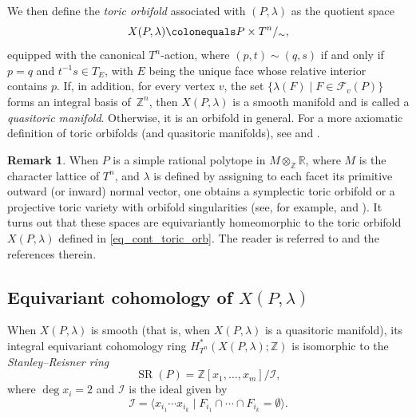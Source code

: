 \documentclass[10pt]{amsart}
\theoremstyle{plain}
\theoremstyle{definition}
\newtheorem{remark}[theorem]{Remark}
\numberwithin{equation}{section}
\newcommand{\RR}{\mathbb{R}}
\newcommand{\ZZ}{\mathbb{Z}}
\DeclareMathOperator{\SR}{SR}
\begin{document}
We then define the \emph{toric orbifold} associated with $(P,\lambda)$ as the quotient space 
\begin{equation}\label{eq_cont_toric_orb}
X(P, \lambda) \colonequals P\times T^n /_\sim,
\end{equation}
equipped with the canonical $T^n$-action, where $(p,t)\sim (q,s)$ if and only if $p=q$ and $t^{-1}s \in T_E$, with $E$ being the unique face whose relative interior contains $p$. If, in addition, for every vertex $v$, the set $\{\lambda(F)\mid F\in \mathcal{F}_v(P)\}$ forms an integral basis of~$\ZZ^n$, then $X(P, \lambda)$ is a smooth manifold and is called a \emph{quasitoric manifold}. Otherwise, it is an orbifold in general. For a more axiomatic definition of toric orbifolds (and quasitoric manifolds), see \cite{DJ, PS} and \cite{BP-book}. 

\begin{remark}\label{rmk_toric_var}
When $P$ is a simple rational polytope in $M\otimes_\ZZ \RR$, where $M$ is the character lattice of $T^n$, and $\lambda$ is defined by assigning to each facet its primitive outward (or inward) normal vector, one obtains a symplectic toric orbifold or a projective toric variety with orbifold singularities (see, for example, \cite{LeTo} and \cite[Chapters 2,3]{CLS}). It turns out that these spaces are  equivariantly homeomorphic to the toric orbifold $X(P, \lambda)$ defined in \eqref{eq_cont_toric_orb}. The reader is  referred to \cite{Fr} and the references therein. 
\end{remark}



\subsection{Equivariant cohomology of $X(P, \lambda)$}
When $X(P, \lambda)$ is smooth (that is, when $X(P,\lambda)$ is a quasitoric manifold), its integral equivariant cohomology ring $H^\ast_{T^n}(X(P,\lambda);\ZZ)$ is isomorphic to the \emph{Stanley--Reisner ring}
\[
\SR(P) = \ZZ[x_1,\ldots,x_m] / \mathcal{I},
\]
where 
$\deg x_i =2$ and $\mathcal{I}$ is the ideal given by
\begin{equation}\label{eq_ideal I}
\mathcal{I}=\langle x_{i_1}\cdots x_{i_k}\mid F_{i_1}\cap\cdots\cap F_{i_k} = \emptyset \rangle.
\end{equation}
\end{document}
